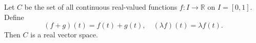 Let $C$ be the set of all continuous real-valued functions $f: I \to \mathbb{R}$ on $I = [0,1]$. Define
$$(f+g)(t) = f(t) + g(t), \quad (\lambda f)(t) = \lambda f(t).$$
Then $C$ is a real vector space.
